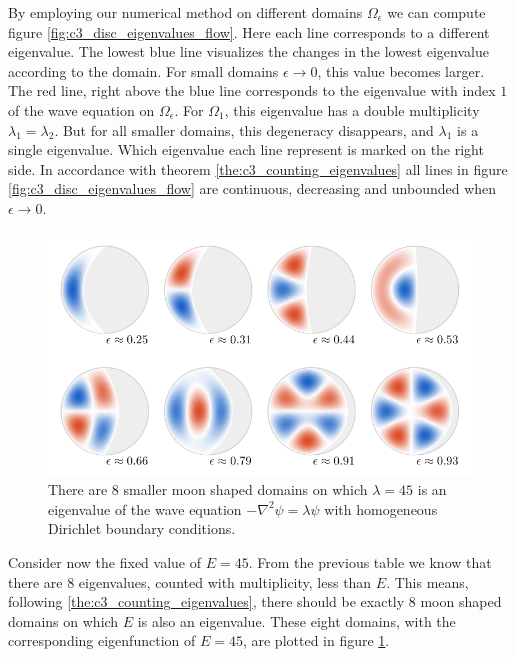By employing our numerical method on different domains $\Omega_\epsilon$ we can compute figure \ref{fig:c3_disc_eigenvalues_flow}. Here each line corresponds to a different eigenvalue. The lowest blue line visualizes the changes in the lowest eigenvalue according to the domain. For small domains $\epsilon \to 0$, this value becomes larger. The red line, right above the blue line corresponds to the eigenvalue with index $1$ of the wave equation on $\Omega_\epsilon$. For $\Omega_1$, this eigenvalue has a double multiplicity $\lambda_1 = \lambda_2$. But for all smaller domains, this degeneracy disappears, and $\lambda_1$ is a single eigenvalue. Which eigenvalue each line represent is marked on the right side. In accordance with theorem \ref{the:c3_counting_eigenvalues} all lines in figure \ref{fig:c3_disc_eigenvalues_flow} are continuous, decreasing and unbounded when $\epsilon \to 0$.


\begin{figure}
    \begin{center}
        \includegraphics[width=\textwidth]{img/chapter3/on_disc/solutions.pdf}
        \caption{There are $8$ smaller moon shaped domains on which $\lambda = 45$ is an eigenvalue of the wave equation $-\nabla^2 \psi = \lambda \psi$ with homogeneous Dirichlet boundary conditions.}
        \label{fig:c3_disc_solutions}
    \end{center}
\end{figure}


Consider now the fixed value of $E = 45$. From the previous table we know that there are $8$ eigenvalues, counted with multiplicity, less than $E$. This means, following \ref{the:c3_counting_eigenvalues}, there should be exactly $8$ moon shaped domains on which $E$ is also an eigenvalue. These eight domains, with the corresponding eigenfunction of $E = 45$, are plotted in figure \ref{fig:c3_disc_solutions}.

\stopchapter
